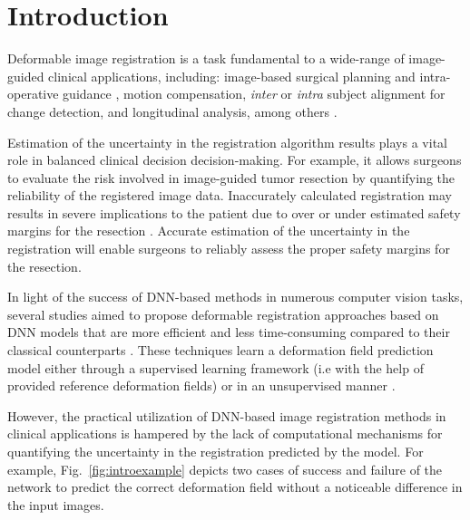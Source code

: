 \documentclass[preprint,authoryear]{elsarticle}
\begin{document}
\section{Introduction}

Deformable image registration is a task fundamental to a wide-range of image-guided clinical applications, including: image-based surgical planning and intra-operative guidance \cite{luo2019applicability}, motion compensation, \textit{inter} or \textit{intra} subject alignment for change detection, and longitudinal analysis, among others \cite{hill2001medical,zitova2003image}. 


Estimation of the uncertainty in the registration algorithm results plays a vital role in balanced clinical decision decision-making. For example, it allows surgeons to evaluate the risk involved in image-guided tumor resection by quantifying the reliability of the registered image data. Inaccurately calculated registration may results in severe implications to the patient due to over or under estimated safety margins for the resection \cite{luo2019applicability,jackson2021effect}. Accurate estimation of the uncertainty in the registration will enable surgeons to reliably assess the proper safety margins for the resection.

In light of the success of DNN-based methods in numerous computer vision tasks, several studies aimed to propose deformable registration approaches based on DNN models that are more efficient and less time-consuming compared to their classical counterparts \cite{dalca2019learning,balakrishnan2018unsupervised,dalca2018varreg,yang2017quicksilver,shao2021prosregnet,de2019deep}. These techniques learn a deformation field prediction model either through a supervised learning framework (i.e with the help of provided reference deformation fields) \cite{yang2017quicksilver} or in an unsupervised manner \cite{balakrishnan2018unsupervised,dalca2018varreg,de2019deep}. 

However, the practical utilization of DNN-based image registration methods in clinical applications is hampered by the lack of computational mechanisms for quantifying the uncertainty in the registration predicted by the model. For example, Fig.~\ref{fig:introexample} depicts two cases of success and failure of the network to predict the correct deformation field without a noticeable difference in the input images. 
\end{document}
